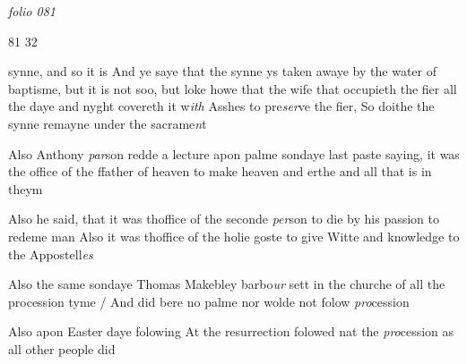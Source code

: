 \documentclass[12pt, a4paper]{book}
\begin{document}
\dotfill
					

\textit{folio 081}


\begin{flushright}{\color{Mahogany}81} 32\end{flushright}
 
 	
				\marginpar[\vspace{0.5cm}{\textcolor{Gray}{herecie}}]{}
			
	
				\marginpar[\vspace{0.5cm}{\textcolor{Gray}{n}}]{}
			
	
		\ifthenelse{\isodd{\thepage}}
		{\reversemarginpar}
		{\normalmarginpar}
		synne, and so it is And ye saye that the synne ys taken
 awaye by the water of baptisme, but it is not soo, but
  loke howe that the wife that occupieth the fier all
 the daye and nyght covereth it w\textit{ith} Asshes to pre\textit{ser}ve
 the fier, So doithe the synne remayne under the sacrame\textit{n}t

	
		
			
	
		\ifthenelse{\isodd{\thepage}}
		{\reversemarginpar}
		{\normalmarginpar}
		Also Anthony \textit{par}son redde a lecture apon palme
 sondaye last paste saying, it was the office of the
 ffather of heaven to make heaven and erthe and all
 that is in theym
 
		\ifthenelse{\isodd{\thepage}}
		{\reversemarginpar}
		{\normalmarginpar}
		Also he said, that it was thoffice of the seconde \textit{per}son
 to die by his passion to redeme man
 Also it was thoffice of the holie goste to give
 Witte and knowledge to the Appostell\textit{es}
	
		
				\marginpar[\vspace{0.5cm}{\textcolor{Gray}{Thomas makeblith ceremonies}}]{}
			
		
		\ifthenelse{\isodd{\thepage}}
		{\reversemarginpar}
		{\normalmarginpar}
		Also the same sondaye Thomas Makebley barbo\textit{ur} sett in the churche of all the procession tyme / And did
 bere no palme nor wolde not folow \textit{pro}cession
	
 
				\marginpar[\vspace{0.5cm}{\textcolor{Gray}{ceremonies}}]{}
			
		\ifthenelse{\isodd{\thepage}}
		{\reversemarginpar}
		{\normalmarginpar}
		Also apon Easter daye folowing At the resurrection
 folowed nat the \textit{pro}cession as all other people did
\end{document}
